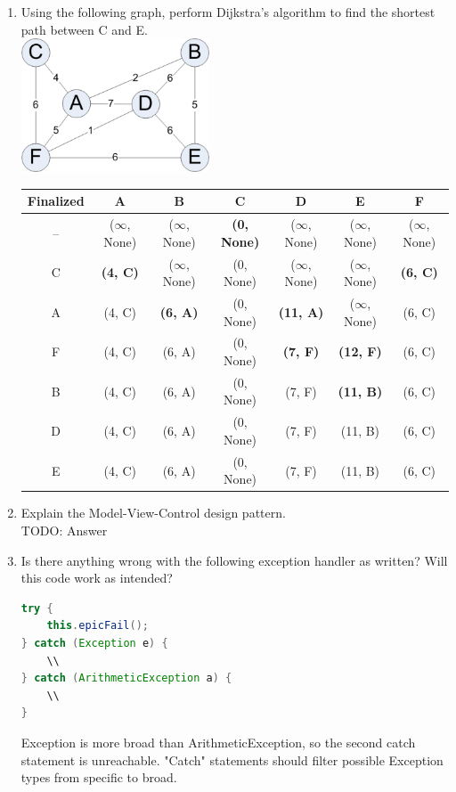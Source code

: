 \documentclass[11pt]{article}
\newenvironment{answer}{\large\lstset{basicstyle=\tiny\ttfamily}\color{white} }{}
\newenvironment{answer}{\large\lstset{basicstyle=\large\ttfamily}\color{red} }{}
\newcommand{\answerrow}[1]{\hline \rowfont{\color{white}} #1}
\newcommand{\answerrow}[1]{\hline \rowfont{\color{red}} #1}
\begin{document}
\begin{enumerate}
\item
Using the following graph, perform Dijkstra's algorithm to find the shortest path between C and E. \\
\includegraphics[height=150px]{graph} \\
\def\arraystretch{1.65}
\begin{tabu}{| c | c | c | c | c | c | c |}
\hline
Finalized & A & B & C & D & E & F\\
\hline
-- & ($\infty$, None) & ($\infty$, None) & \textbf{(0, None)} & ($\infty$, None) & ($\infty$, None) & ($\infty$, None) \\
\answerrow{C & \textbf{(4, C)} & ($\infty$, None) & (0, None) & ($\infty$, None) & ($\infty$, None) & \textbf{(6, C)}} \\
\answerrow{A & (4, C) & \textbf{(6, A)} & (0, None) & \textbf{(11, A)} & ($\infty$, None) & (6, C)} \\
\answerrow{F & (4, C) & (6, A) & (0, None) & \textbf{(7, F)} & \textbf{(12, F)} & (6, C)} \\
\answerrow{B & (4, C) & (6, A) & (0, None) & (7, F) & \textbf{(11, B)} & (6, C)} \\
\answerrow{D & (4, C) & (6, A) & (0, None) & (7, F) & (11, B) & (6, C)} \\
\answerrow{E & (4, C) & (6, A) & (0, None) & (7, F) & (11, B) & (6, C)} \\
\hline
\end{tabu}


\newpage
\item Explain the Model-View-Control design pattern. \\
\begin{answer}
TODO: Answer
\end{answer}




\item Is there anything wrong with the following exception handler as written? Will this
code work as intended? 
\begin{lstlisting}[language=java]
try {
	this.epicFail();
} catch (Exception e) {
	\\
} catch (ArithmeticException a) {
	\\
}
\end{lstlisting}
\begin{answer}
Exception is more broad than ArithmeticException, so the second catch statement is unreachable.  "Catch" statements should filter possible Exception types from specific to broad.
\end{answer}




\end{enumerate}
\end{document}
